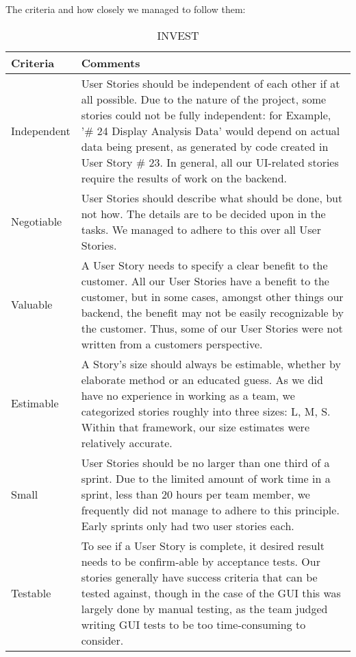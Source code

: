 \newpage
The criteria and how closely we managed to follow them:
\begin{table}[h]
  \caption{INVEST}
  \label{INVEST}
  \centering
  \begin{tabular}{|p{3cm} | p{9cm}|}
	\hline  	 
  	 Criteria & Comments \\ 
  	 \hline
  	 \hline
  	Independent & User Stories should be independent of each other if at all possible. Due to the nature of the project, some stories could not be fully independent: for Example, '\# 24 Display Analysis Data' would depend on actual data being present, as generated by code created in User Story \# 23. In general, all our UI-related stories require the results of work on the backend.  \\ 
  	\hline
  	 Negotiable & User Stories should describe what should be done, but not how. The details are to be decided upon in the tasks. We managed to adhere to this over all User Stories.  \\ 
  	\hline
  	Valuable & A User Story needs to specify a clear benefit to the customer. All our User Stories have a benefit to the customer, but in some cases, amongst other things our backend, the benefit may not be easily recognizable by the customer. Thus, some of our User Stories were not written from a customers perspective. \\ 
  	\hline
  	Estimable & A Story's size should always be estimable, whether by elaborate method or an educated guess. As we did have no experience in working as a team, we categorized stories roughly into three sizes: L, M, S.  Within that framework, our size estimates were relatively accurate.   \\ 
  	\hline
  	Small & User Stories should be no larger than one third of a sprint. Due to the limited amount of work time in a sprint, less than 20 hours per team member, we frequently did not manage to adhere to this principle. Early sprints only had two user stories each.  \\ 
  	\hline
  	Testable & To see if a User Story is complete, it desired result needs to be confirm-able by acceptance tests. Our stories generally have success criteria that can be tested against, though in the case of the GUI this was largely done by manual testing, as the team judged writing GUI tests to be too time-consuming to consider. \\ 
  	\hline
  \end{tabular}
\end{table}

